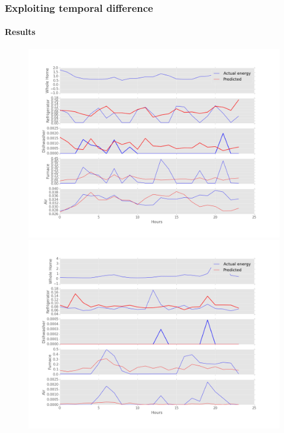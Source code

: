 \documentclass{beamer}              %
\begin{document}
\begin{frame}
	\frametitle{Exploiting temporal difference}
	\framesubtitle{Results}
	\begin{figure}[H]
		\centering
		\begin{minipage}{.3\textwidth}
			\centering
			\includegraphics[scale=0.09]{./figures/normal_250_24.png}
		\end{minipage}%
		\begin{minipage}{.3\textwidth}
			\centering
			\includegraphics[scale=0.09]{./figures/days_250_24.png}
		\end{minipage}
		\begin{minipage}{.3\textwidth}
			\centering

\end{minipage}
\end{figure}
\end{frame}
\end{document}
